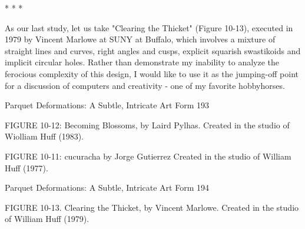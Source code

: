                                          *   *   *

As our last study, let us take "Clearing the Thicket" (Figure 10-13), executed in 1979 by
Vincent Marlowe at SUNY at Buffalo, which involves a mixture of straight lines and
curves, right angles and cusps, explicit squarish swastikoids and implicit circular holes.
Rather than demonstrate my inability to analyze the ferocious complexity of this design, I
would like to use it as the jumping-off point for a discussion of computers and creativity -
one of my favorite hobbyhorses.




Parquet Deformations: A Subtle, Intricate Art Form                                      193

                                               FIGURE 10-12: Becoming Blossoms, by
                                               Laird Pylhas. Created in the studio of
                                               Wiolliam Huff (1983).




FIGURE 10-11: cucuracha by Jorge
Gutierrez Created in the studio of
William Huff (1977).




Parquet Deformations: A Subtle, Intricate Art Form                               194

FIGURE 10-13. Clearing the Thicket, by Vincent Marlowe. Created in the studio of
William Huff (1979).

